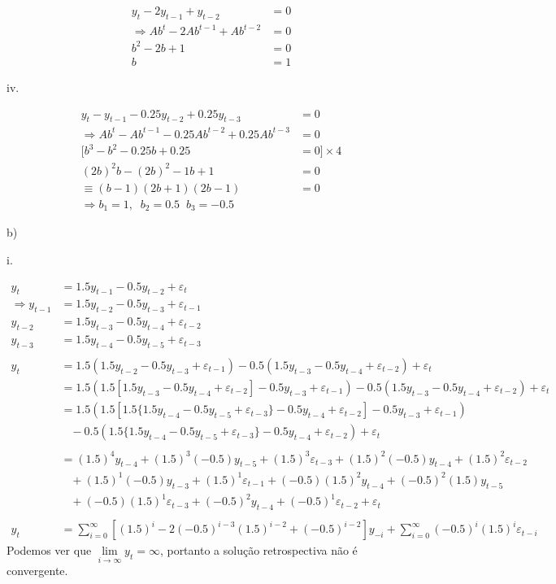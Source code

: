 \begin{enumerate}
	\begin{align*}
	y_t-2y_{t-1}+y_{t-2}&=0\\
	\Rightarrow Ab^t-2Ab^{t-1}+Ab^{t-2}&=0\\
	b^2-2b+1&=0\\
	b&=1
	\end{align*}
	
	iv.
	
	\begin{align*}
		y_t-y_{t-1}-0.25y_{t-2}+0.25y_{t-3}&=0\\
		\Rightarrow Ab^t-Ab^{t-1}-0.25Ab^{t-2}+0.25Ab^{t-3}&=0\\
		[b^3-b^2-0.25b+0.25&=0]\times 4\\
		(2b)^2b-(2b)^2-1b+1&=0\\
		\equiv (b-1)(2b+1)(2b-1)&=0\\
		\Rightarrow b_1=1,\;\;b_2=0.5\;\;b_3=-0.5
	\end{align*}
	
	b)
	
	i. 
	
	\begin{align*}
		y_t&=1.5y_{t-1}-0.5y_{t-2}+\varepsilon_t\\
		\Rightarrow y_{t-1}&=1.5y_{t-2}-0.5y_{t-3}+\varepsilon_{t-1}\\
		y_{t-2}&=1.5y_{t-3}-0.5y_{t-4}+\varepsilon_{t-2}\\
		y_{t-3}&=1.5y_{t-4}-0.5y_{t-5}+\varepsilon_{t-3}\\
		\\
		y_t&=1.5(1.5y_{t-2}-0.5y_{t-3}+\varepsilon_{t-1})-0.5(1.5y_{t-3}-0.5y_{t-4}+\varepsilon_{t-2})+\varepsilon_t\\
		&=1.5(1.5[1.5y_{t-3}-0.5y_{t-4}+\varepsilon_{t-2}]-0.5y_{t-3}+\varepsilon_{t-1})-0.5(1.5y_{t-3}-0.5y_{t-4}+\varepsilon_{t-2})+\varepsilon_t\\
		&=1.5(1.5[1.5\{1.5y_{t-4}-0.5y_{t-5}+\varepsilon_{t-3}\}-0.5y_{t-4}+\varepsilon_{t-2}]-0.5y_{t-3}+\varepsilon_{t-1})\\
		&\;\;\;-0.5(1.5\{1.5y_{t-4}-0.5y_{t-5}+\varepsilon_{t-3}\}-0.5y_{t-4}+\varepsilon_{t-2})+\varepsilon_t\\
		\\
		&=(1.5)^4y_{t-4}+(1.5)^{3}(-0.5)y_{t-5}+(1.5)^{3}\varepsilon_{t-3}+(1.5)^{2}(-0.5)y_{t-4}+(1.5)^2\varepsilon_{t-2}\\
		&\;\;\;+(1.5)^{1}(-0.5)y_{t-3}+(1.5)^{1}\varepsilon_{t-1}+(-0.5)(1.5)^{2}y_{t-4}+(-0.5)^{2}(1.5)y_{t-5}\\
		&\;\;\;+(-0.5)(1.5)^{1}\varepsilon_{t-3}+(-0.5)^{2}y_{t-4}+(-0.5)^{1}\varepsilon_{t-2}+\varepsilon_t\\
		\\
		y_t&=\sum \limits_{i=0}^{\infty}[(1.5)^i-2(-0.5)^{i-3}(1.5)^{i-2}+(-0.5)^{i-2}]y_{-i}+\sum \limits_{i=0}^{\infty}(-0.5)^i(1.5)^i\varepsilon_{t-i}
	\end{align*}
	Podemos ver que $\lim\limits_{i\rightarrow \infty}y_t=\infty$, portanto a solução retrospectiva não é convergente.
	

\end{enumerate}
